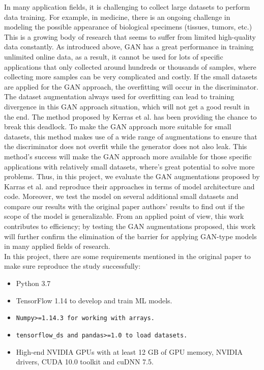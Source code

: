 \documentclass{report}
\begin{document}
In many application fields, it is challenging to collect large datasets to perform data training. For example, in medicine, there is an ongoing challenge in modeling the possible appearance of biological specimens (tissues, tumors, etc.) This is a growing body of research that seems to suffer from limited high-quality data constantly. As introduced above, GAN has a great performance in training unlimited online data\cite{goodfellow2014generative, miyato2018cgans, miyato2018spectral, brock2018large, karras2017progressive, karras2019style, karras2020analyzing}, as a result, it cannot be used for lots of specific applications that only collected around hundreds or thousands of samples, where collecting more samples can be very complicated and costly. If the small datasets are applied for the GAN approach, the overfitting will occur in the discriminator. The dataset augmentation always used for overfitting can lead to training divergence in this GAN approach situation, which will not get a good result in the end. The method proposed by Kerras et al. has been providing the chance to break this deadlock. To make the GAN approach more suitable for small datasets, this method makes use of a wide range of augmentations to ensure that the discriminator does not overfit while the generator does not also leak. This method's success will make the GAN approach more available for those specific applications with relatively small datasets, where's great potential to solve more problems. Thus, in this project, we evaluate the GAN augmentations proposed by Karras et al. and reproduce their approaches in terms of model architecture and code. Moreover, we test the model on several additional small datasets and compare our results with the original paper authors' results to find out if the scope of the model is generalizable. From an applied point of view, this work contributes to efficiency; by testing the GAN augmentations proposed, this work will further confirm the elimination of the barrier for applying GAN-type
models in many applied fields of research. \\

In this project, there are some requirements mentioned in the original paper to make sure reproduce the study successfully:
\begin{itemize}
\item Python 3.7
    \item TensorFlow 1.14 to develop and train ML models.
    \item \texttt{Numpy>=1.14.3 for working with arrays.}
    \item \texttt{tensorflow\_ds and pandas>=1.0 to load datasets.}
    \item High-end NVIDIA GPUs with at least 12 GB of GPU memory, NVIDIA drivers, CUDA 10.0 toolkit and cuDNN 7.5.
\end{itemize}
\end{document}

